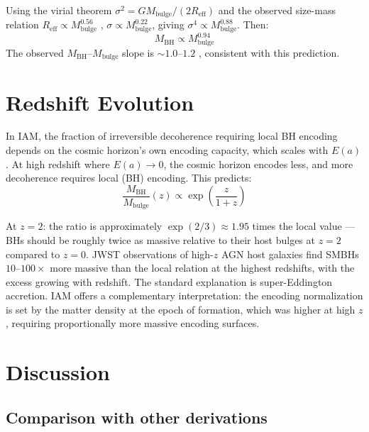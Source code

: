 \documentclass[12pt,a4paper]{article}
\begin{document}
Using the virial theorem $\sigma^2 = GM_\mathrm{bulge}/(2R_\mathrm{eff})$ and the
observed size-mass relation $R_\mathrm{eff} \propto M_\mathrm{bulge}^{0.56}$
\citep{Shen2003}, $\sigma \propto M_\mathrm{bulge}^{0.22}$, giving
$\sigma^4 \propto M_\mathrm{bulge}^{0.88}$. Then:
\begin{equation}
M_\mathrm{BH} \propto M_\mathrm{bulge}^{0.94}
\end{equation}
The observed $M_\mathrm{BH}$--$M_\mathrm{bulge}$ slope is $\sim 1.0$--$1.2$
\citep{McConnell2013,Kormendy2013}, consistent with this prediction.

\section{Redshift Evolution}

In IAM, the fraction of irreversible decoherence requiring local BH encoding
depends on the cosmic horizon's own encoding capacity, which scales with $E(a)$.
At high redshift where $E(a) \to 0$, the cosmic horizon encodes less, and more
decoherence requires local (BH) encoding. This predicts:
\begin{equation}
\frac{M_\mathrm{BH}}{M_\mathrm{bulge}}(z) \propto \exp\!\left(\frac{z}{1+z}\right)
\end{equation}

At $z = 2$: the ratio is approximately $\exp(2/3) \approx 1.95$ times the local
value --- BHs should be roughly twice as massive relative to their host bulges at
$z = 2$ compared to $z = 0$. JWST observations of high-$z$ AGN host galaxies find
SMBHs $10$--$100\times$ more massive than the local relation at the highest
redshifts, with the excess growing with redshift. The standard explanation is
super-Eddington accretion. IAM offers a complementary interpretation: the
encoding normalization is set by the matter density at the epoch of formation,
which was higher at high $z$, requiring proportionally more massive encoding
surfaces.

\section{Discussion}

\subsection{Comparison with other derivations}
\end{document}
